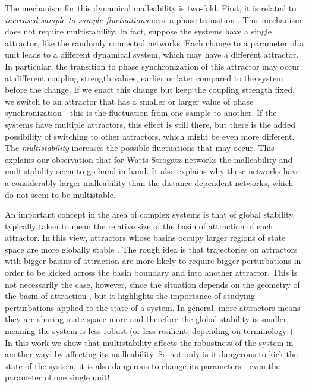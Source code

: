 The mechanism for this dynamical malleability is two-fold. First, it is related to \textit{increased sample-to-sample fluctuations} near a phase transition \cite{hong2007entrainment, hong2007finitesizescalingpre}. This mechanism does not require multistability. In fact, suppose the systems have a single attractor, like the randomly connected networks. Each change to a parameter of a unit leads to a different dynamical system, which may have a different attractor. In particular, the transition to phase synchronization of this attractor may occur at different coupling strength values, earlier or later compared to the system before the change. If we enact this change but keep the coupling strength fixed, we switch to an attractor that has a smaller or larger value of phase synchronization - this is the fluctuation from one sample to another. If the systems have multiple attractors, this effect is still there, but there is the added possibility of switching to other attractors, which might be even more different. The \textit{multistability} increases the possible fluctuations that may occur. This explains our observation that for Watts-Strogatz networks the malleability and multistability seem to go hand in hand. It also explains why these networks have a considerably larger malleability than the distance-dependent networks, which do not seem to be multistable.

An important concept in the area of complex systems is that of global stability, typically taken to mean the relative size of the basin of attraction of each attractor. In this view, attractors whose basins occupy larger regions of state space are more globally stable \cite{menck2013how}. The rough idea is that trajectories on attractors with bigger basins of attraction are more likely to require bigger perturbations in order to be kicked across the basin boundary and into another attractor. This is not necessarily the case, however, since the situation depends on the geometry of the basin of attraction \cite{krakovska2023resilience}, but it highlights the importance of studying perturbations applied to the state of a system. In general, more attractors means they are sharing state space more and therefore the global stability is smaller, meaning the system is less robust (or less resilient, depending on terminology \cite{krakovska2023resilience}). In this work we show that multistability affects the robustness of the system in another way: by affecting its malleability. So not only is it dangerous to kick the state of the system, it is also dangerous to change its parameters - even the parameter of one single unit!

